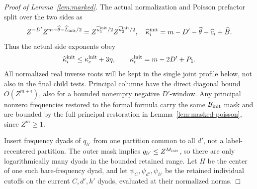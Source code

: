 \documentclass[11pt,a4paper]{article}
\numberwithin{equation}{section}
\numberwithin{figure}{section}
\theoremstyle{definition}
\theoremstyle{remark}
\begin{document}
\begin{proof}[Proof of Lemma~\ref{lem:marked}]
The actual normalization and Poisson prefactor split over the two sides as
\[
 Z^{-D'}Z^{m-\widehat\theta-\widehat L_{\rm init}/2}
   =Z^{\widehat\kappa_1^{\rm init}/2}
      Z^{\widehat\kappa_2^{\rm init}/2},
 \quad
 \widehat\kappa_i^{\rm init}=m-D'-\widehat\theta-\widehat c_i+\widehat B.
\]
Thus the actual side exponents obey
\begin{equation}\label{eq:initial-poisson-prefactor}
 \widehat\kappa_i^{\rm init}\le\kappa_c^{\rm init}+3\eta,
 \qquad \kappa_c^{\rm init}=m-2D'+P_1.
\end{equation}
All normalized real inverse roots will be kept in the single joint
profile below, not also in the final child tests.
Principal columns have the direct diagonal bound \(O(Z^{m+\epsilon})\),
also for a bounded nonempty negative \(D'\)-window.  Any principal nonzero
frequencies restored to the formal formula carry the same
\(\mathcal B_{\rm init}\) mask and are bounded by the full principal
restoration in Lemma~\ref{lem:masked-poisson}, since \(Z^m\ge1\).

Insert frequency dyads of \(q_{h'}\) from one partition common to all
\(d'\), not a label-recentered partition.  The outer mask implies
\(q_{h'}\le Z^{M_{\rm init}}\), so there are only logarithmically many
dyads in the bounded retained range.  Let \(H\) be the center of one
such bare-frequency dyad, and let \(\psi_C,\psi_{d'},\psi_{h'}\)
be the retained individual cutoffs on the current \(C,d',h'\) dyads,
evaluated at their normalized norms.


\end{proof}
\end{document}
